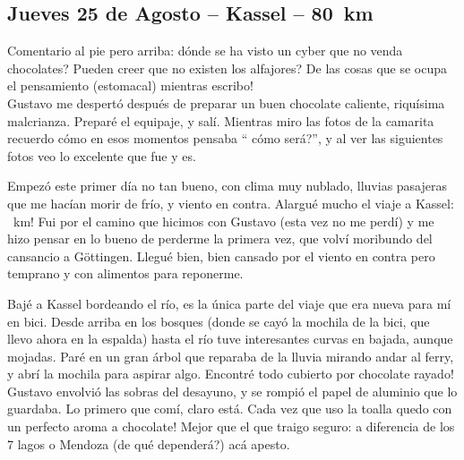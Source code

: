 \subsection*{Jueves 25 de Agosto -- Kassel -- 80~km}

Comentario al pie pero arriba: \textquestiondown d\'onde se ha visto un cyber
que no venda chocolates? \textquestiondown Pueden creer que no existen los
alfajores? \textexclamdown De las cosas que se ocupa el pensamiento (estomacal)
mientras escribo!\\

Gustavo me despert\'o despu\'es de preparar un buen chocolate caliente,
riqu\'isima malcrianza. Prepar\'e el equipaje, y sal\'i. Mientras miro las fotos
de la camarita recuerdo c\'omo en esos momentos pensaba ``\textquestiondown
c\'omo ser\'a?'', y al ver las siguientes fotos veo lo excelente que fue y es.

Empez\'o este primer d\'ia no tan bueno, con clima muy nublado, lluvias
pasajeras que me hac\'ian morir de fr\'io, y viento en contra. Alargu\'e mucho
el viaje a Kassel: ~km! Fui por el camino que hicimos con
Gustavo (esta vez no me perd\'i) y me hizo pensar en lo bueno de perderme la
primera vez, que volv\'i moribundo del cansancio a G\"ottingen. Llegu\'e bien,
bien cansado por el viento en contra pero temprano y con alimentos para
reponerme.

Baj\'e a Kassel bordeando el r\'io, es la \'unica parte del viaje que era nueva
para m\'i en bici. Desde arriba en los bosques (donde se cay\'o la mochila de la
bici, que llevo ahora en la espalda) hasta el r\'io tuve interesantes curvas en
bajada, aunque mojadas. Par\'e en un gran \'arbol que reparaba de la lluvia
mirando andar al ferry, y abr\'i la mochila para aspirar algo. \textexclamdown
Encontr\'e todo cubierto por chocolate rayado! Gustavo envolvi\'o las sobras del
desayuno, y se rompi\'o el papel de aluminio que lo guardaba. Lo primero que
com\'i, claro est\'a. \textexclamdown Cada vez que uso la toalla quedo con un
perfecto aroma a chocolate! Mejor que el que traigo seguro: a diferencia de los
7 lagos o Mendoza (\textquestiondown de qu\'e depender\'a?) ac\'a apesto.


